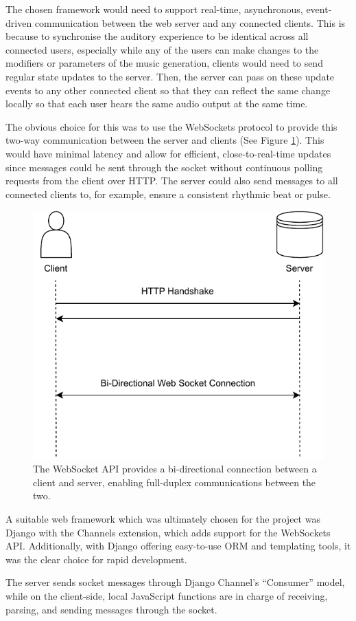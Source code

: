 The chosen framework would need to support real-time, asynchronous, event-driven communication between the web server and any connected clients. This is because to synchronise the auditory experience to be identical across all connected users, especially while any of the users can make changes to the modifiers or parameters of the music generation, clients would need to send regular state updates to the server. Then, the server can pass on these update events to any other connected client so that they can reflect the same change locally so that each user hears the same audio output at the same time.

The obvious choice for this was to use the WebSockets protocol to provide this two-way communication between the server and clients (See Figure \ref{fig:websocket}). This would have minimal latency and allow for efficient, close-to-real-time updates since messages could be sent through the socket without continuous polling requests from the client over HTTP. The server could also send messages to all connected clients to, for example, ensure a consistent rhythmic beat or pulse.

\begin{figure}[htb]
    \centering
    \includegraphics[width=0.5\linewidth]{images/implementation/websocket.pdf}    
    \caption{The WebSocket API provides a bi-directional connection between a client and server, enabling full-duplex communications between the two.}
    \label{fig:websocket}
\end{figure}

A suitable web framework which was ultimately chosen for the project was Django with the Channels extension, which adds support for the WebSockets API. Additionally, with Django offering easy-to-use ORM and templating tools, it was the clear choice for rapid development.

The server sends socket messages through Django Channel’s “Consumer” model, while on the client-side, local JavaScript functions are in charge of receiving, parsing, and sending messages through the socket.


